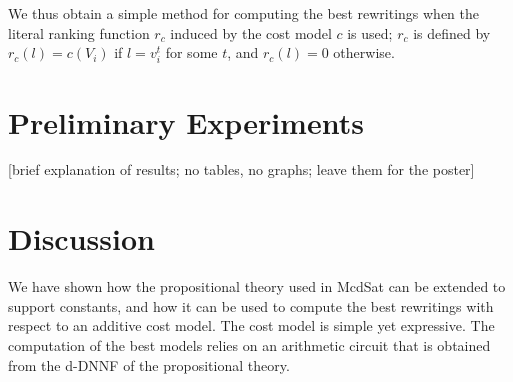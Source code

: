 \documentclass{sig-alternate}
\begin{document}
We thus obtain a simple method for computing the best
rewritings when the literal ranking function $r_c$ induced
by the cost model $c$ is used; $r_c$ is defined by
$r_c(l)=c(V_i)$ if $l=v^t_i$ for some $t$, and $r_c(l)=0$
otherwise.

\section{Preliminary Experiments}

[brief explanation of results; no tables, no graphs; leave them for the poster]

\section{Discussion}

We have shown how the propositional theory used in McdSat can
be extended to support constants, and how it can be used to 
compute the best rewritings with respect to an additive
cost model. The cost model is simple yet expressive.
The computation of the best models relies on an arithmetic
circuit that is obtained from the d-DNNF of the propositional
theory.

\small


\end{document}
